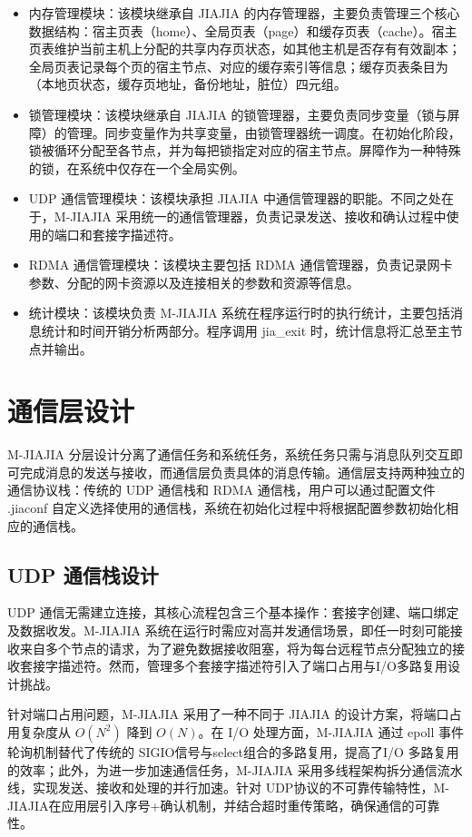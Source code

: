 {\begin{itemize}
        \item 内存管理模块：该模块继承自 JIAJIA 的内存管理器，主要负责管理三个核心数据结构：宿主页表（home）、全局页表（page）和缓存页表（cache）。宿主页表维护当前主机上分配的共享内存页状态，如其他主机是否存有有效副本；全局页表记录每个页的宿主节点、对应的缓存索引等信息；缓存页表条目为（本地页状态，缓存页地址，备份地址，脏位）四元组。
        \item 锁管理模块：该模块继承自 JIAJIA 的锁管理器，主要负责同步变量（锁与屏障）的管理。同步变量作为共享变量，由锁管理器统一调度。在初始化阶段，锁被循环分配至各节点，并为每把锁指定对应的宿主节点。屏障作为一种特殊的锁，在系统中仅存在一个全局实例。
        \item UDP 通信管理模块：该模块承担 JIAJIA 中通信管理器的职能。不同之处在于，M-JIAJIA 采用统一的通信管理器，负责记录发送、接收和确认过程中使用的端口和套接字描述符。
        \item RDMA 通信管理模块：该模块主要包括 RDMA 通信管理器，负责记录网卡参数、分配的网卡资源以及连接相关的参数和资源等信息。
        \item 统计模块：该模块负责 M-JIAJIA 系统在程序运行时的执行统计，主要包括消息统计和时间开销分析两部分。程序调用 jia\_exit 时，统计信息将汇总至主节点并输出。
    \end{itemize}
    \section{通信层设计}
    M-JIAJIA 分层设计分离了通信任务和系统任务，系统任务只需与消息队列交互即可完成消息的发送与接收，而通信层负责具体的消息传输。通信层支持两种独立的通信协议栈：传统的 UDP 通信栈和 RDMA 通信栈，用户可以通过配置文件 .jiaconf 自定义选择使用的通信栈，系统在初始化过程中将根据配置参数初始化相应的通信栈。

    \subsection{UDP 通信栈设计}
    UDP 通信无需建立连接，其核心流程包含三个基本操作：套接字创建、端口绑定及数据收发。M-JIAJIA 系统在运行时需应对高并发通信场景，即任一时刻可能接收来自多个节点的请求，为了避免数据接收阻塞，将为每台远程节点分配独立的接收套接字描述符。然而，管理多个套接字描述符引入了端口占用与I/O多路复用设计挑战。

    针对端口占用问题，M-JIAJIA 采用了一种不同于 JIAJIA  的设计方案，将端口占用复杂度从 $O(N^2)$ 降到 $O(N)$。在 I/O 处理方面，M-JIAJIA 通过 epoll 事件轮询机制替代了传统的 SIGIO信号与select组合的多路复用，提高了I/O 多路复用的效率；此外，为进一步加速通信任务，M-JIAJIA 采用多线程架构拆分通信流水线，实现发送、接收和处理的并行加速。针对 UDP协议的不可靠传输特性，M-JIAJIA在应用层引入序号+确认机制，并结合超时重传策略，确保通信的可靠性。

}
